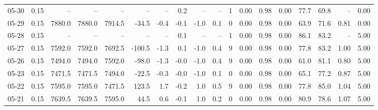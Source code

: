 \begin{threeparttable}
{\begin{tabular}{lrrrrrrrrrrrrrrrrr}
  05-30 &     0.15 &     -- &     -- &     -- &         -- &             -- &                       0.2 &                       -- &                  -- &              1 &       0.00 &      0.98 &           0.00 &             77.7 &                69.8 &              -- &                   0.00 \\
  05-29 &     0.15 & 7880.0 & 7880.0 & 7914.5 &      -34.5 &           -0.4 &                      -0.1 &                     -1.0 &                 0.1 &              0 &       0.00 &      0.98 &           0.00 &             63.9 &                71.6 &            0.81 &                   0.00 \\
  05-28 &     0.15 &     -- &     -- &     -- &         -- &             -- &                       0.1 &                       -- &                  -- &              1 &       0.00 &      0.98 &           0.00 &             86.1 &                83.2 &              -- &                   5.00 \\
  05-27 &     0.15 & 7592.0 & 7592.0 & 7692.5 &     -100.5 &           -1.3 &                       0.1 &                     -1.0 &                 0.4 &              9 &       0.00 &      0.98 &           0.00 &             77.8 &                83.2 &            1.00 &                   5.00 \\
  05-26 &     0.15 & 7494.0 & 7494.0 & 7592.0 &      -98.0 &           -1.3 &                      -0.0 &                     -1.0 &                 0.4 &              9 &       0.00 &      0.98 &           0.00 &             61.0 &                81.1 &            0.80 &                   5.00 \\
  05-23 &     0.15 & 7471.5 & 7471.5 & 7494.0 &      -22.5 &           -0.3 &                      -0.0 &                     -1.0 &                 0.1 &              0 &       0.00 &      0.98 &           0.00 &             65.1 &                77.2 &            0.87 &                   5.00 \\
  05-22 &     0.15 & 7595.0 & 7595.0 & 7471.5 &      123.5 &            1.7 &                      -0.2 &                      1.0 &                 0.5 &              9 &       0.00 &      0.98 &           0.00 &             77.8 &                85.0 &            1.04 &                   5.00 \\
  05-21 &     0.15 & 7639.5 & 7639.5 & 7595.0 &       44.5 &            0.6 &                      -0.1 &                      1.0 &                 0.2 &              0 &       0.00 &      0.98 &           0.00 &             80.9 &                78.6 &            1.07 &                   5.00 \\

\end{tabular}}
\end{threeparttable}
